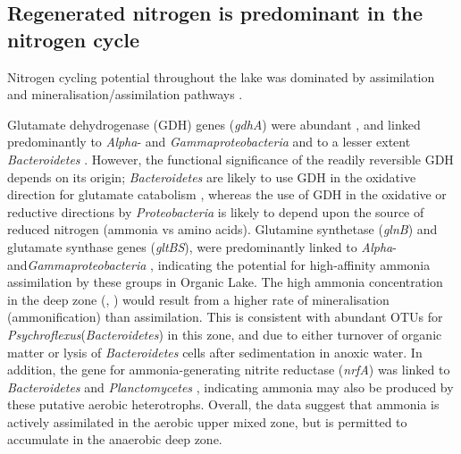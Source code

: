 \subsection{Regenerated nitrogen is predominant in the nitrogen cycle}
Nitrogen cycling potential throughout the lake was dominated by assimilation and mineralisation/assimilation pathways . 
 
Glutamate dehydrogenase (GDH) genes (\emph{gdhA}) were abundant , and linked predominantly to \emph{Alpha}- and \emph{Gammaproteobacteria} and to a lesser extent \emph{Bacteroidetes} . 
However, the functional significance of the readily reversible GDH depends on its origin; \emph{Bacteroidetes} are likely to use GDH in the oxidative direction for glutamate catabolism \cite{Williams2012b}, whereas the use of GDH in the oxidative or reductive directions by \emph{Proteobacteria} is likely to depend upon the source of reduced nitrogen (ammonia vs amino acids). 
Glutamine synthetase (\emph{glnB}) and glutamate synthase genes (\emph{gltBS}), were predominantly linked to \emph{Alpha}- and\emph{Gammaproteobacteria} , indicating the potential for high-affinity ammonia assimilation by these groups in Organic Lake. 
The high ammonia concentration in the deep zone (, ) would result from a higher rate of mineralisation (ammonification) than assimilation. 
This is consistent with abundant \acp{OTU} for \emph{Psychroflexus}(\emph{Bacteroidetes}) in this zone, and due to either turnover of organic matter or lysis of \emph{Bacteroidetes} cells after sedimentation in anoxic water. 
In addition, the gene for ammonia-generating nitrite reductase (\emph{nrfA}) was linked to \emph{Bacteroidetes} and \emph{Planctomycetes} , indicating ammonia may also be produced by these putative aerobic heterotrophs. 
Overall, the data suggest that ammonia is actively assimilated in the aerobic upper mixed zone, but is permitted to accumulate in the anaerobic deep zone.


